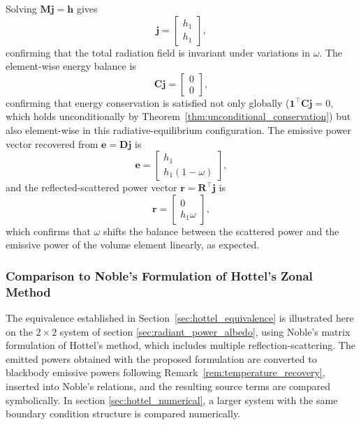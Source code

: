 \documentclass[preprint,1p,times]{elsarticle}
\theoremstyle{plain}
\theoremstyle{definition}
\theoremstyle{remark}
\begin{document}
Solving $\mathbf{M}\mathbf{j} = \mathbf{h}$ gives
\begin{equation}
\mathbf{j} = \begin{bmatrix} h_1 \\ h_1 \end{bmatrix},
\end{equation}
confirming that the total radiation field is invariant under variations in $\omega$. The element-wise energy balance is
\begin{equation}
\mathbf{C}\mathbf{j} = \begin{bmatrix} 0 \\ 0 \end{bmatrix},
\end{equation}
confirming that energy conservation is satisfied not only globally ($\mathbf{1}^\top\mathbf{C}\mathbf{j} = 0$, which holds unconditionally by Theorem~\ref{thm:unconditional_conservation}) but also element-wise in this radiative-equilibrium configuration. The emissive power vector recovered from $\mathbf{e} = \mathbf{D}\mathbf{j}$ is
\begin{equation}
\mathbf{e} = \begin{bmatrix} h_1 \\ h_1(1-\omega) \end{bmatrix},
\end{equation}
and the reflected-scattered power vector $\mathbf{r} = \mathbf{R}^\top \mathbf{j}$ is
\begin{equation}
\mathbf{r} = \begin{bmatrix} 0 \\ h_1\omega \end{bmatrix},
\end{equation}
which confirms that $\omega$ shifts the balance between the scattered power and the emissive power of the volume element linearly, as expected.

\subsubsection{Comparison to Noble's Formulation of Hottel's Zonal Method}
\label{sec:hottel_symbolic}

The equivalence established in Section~\ref{sec:hottel_equivalence} is illustrated here on the $2\times 2$ system of section \ref{sec:radiant_power_albedo}, using Noble's matrix formulation \citep{Noble1975} of Hottel's method, which includes multiple reflection-scattering. The emitted powers obtained with the proposed formulation are converted to blackbody emissive powers following Remark~\ref{rem:temperature_recovery}, inserted into Noble's relations, and the resulting source terms are compared symbolically. In section \ref{sec:hottel_numerical}, a larger system with the same boundary condition structure is compared numerically.
\end{document}

